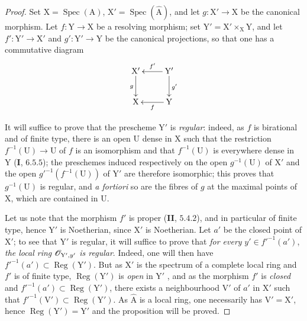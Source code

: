 \begin{proof}
Set $\mathrm{X}=\operatorname{Spec}(\mathrm{A})$, $\mathrm{X}'=\operatorname{Spec}(\widehat{\mathrm{A}})$, and let $g:\mathrm{X}'\to\mathrm{X}$ be the canonical morphism. Let $f:\mathrm{Y}\to\mathrm{X}$ be a resolving morphism; set $\mathrm{Y}'=\mathrm{X}'\times_\mathrm{X}\mathrm{Y}$, and let $f':\mathrm{Y}'\to\mathrm{X}'$ and $g':\mathrm{Y}'\to\mathrm{Y}$ be the canonical projections, so that one has a commutative diagram
\[
  \xymatrix{
    \mathrm{X}' \ar[d]_g & \mathrm{Y}' \ar[l]_{f'} \ar[d]^{g'} \\
    \mathrm{X} & \mathrm{Y} \ar[l]^f
  }
\]

It will suffice to prove that the prescheme $\mathrm{Y}'$ is \emph{regular}: indeed, as $f$ is birational and of finite type, there is an open $\mathrm{U}$ dense in $\mathrm{X}$ such that the restriction $f^{-1}(\mathrm{U})\to\mathrm{U}$ of $f$ is an isomorphism and that $f^{-1}(\mathrm{U})$ is everywhere dense in $\mathrm{Y}$ (\textbf{I}, $6.5.5$); the preschemes induced respectively on the open $g^{-1}(\mathrm{U})$ of $\mathrm{X}'$ and the open $g'^{-1}(f^{-1}(\mathrm{U}))$ of $\mathrm{Y}'$ are therefore isomorphic; this proves that $g^{-1}(\mathrm{U})$ is regular, and \emph{a fortiori} so are the fibres of $g$ at the maximal points of $\mathrm{X}$, which are contained in $\mathrm{U}$.


Let us note that the morphism $f'$ is proper (\textbf{II}, $5.4.2$), and in particular of finite type, hence $\mathrm{Y}'$ is Noetherian, since $\mathrm{X}'$ is Noetherian. Let $a'$ be the closed point of $\mathrm{X}'$; to see that $\mathrm{Y}'$ is regular, it will suffice to prove that \emph{for every} $y'\in f'^{-1}(a')$, \emph{the local ring} $\mathscr{O}_{\mathrm{Y}',y'}$ \emph{is regular}. Indeed, one will then have $f'^{-1}(a')\subset\operatorname{Reg}(\mathrm{Y}')$. But as $\mathrm{X}'$ is the spectrum of a complete local ring and $f'$ is of finite type, $\operatorname{Reg}(\mathrm{Y}')$ is \emph{open} in $\mathrm{Y}'$ , and as the morphism $f'$ is \emph{closed} and $f'^{-1}(a')\subset\operatorname{Reg}(\mathrm{Y}')$, there exists a neighbourhood $\mathrm{V}'$ of $a'$ in $\mathrm{X}'$ such that $f'^{-1}(\mathrm{V}')\subset\operatorname{Reg}(\mathrm{Y}')$. As $\widehat{\mathrm{A}}$ is a local ring, one necessarily has $\mathrm{V}'=\mathrm{X}'$, hence $\operatorname{Reg}(\mathrm{Y}')=\mathrm{Y}'$ and the proposition will be proved.


\end{proof}
